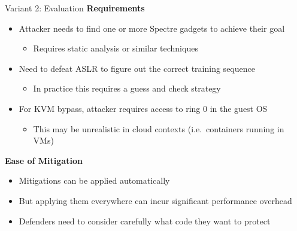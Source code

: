 \documentclass[10pt, dvipsnames, aspectratio=169]{beamer}
\begin{document}
\begin{frame}[c, fragile]{Variant 2: Evaluation}{}
  {\bf Requirements}
  \begin{itemize}
    \item Attacker needs to find one or more Spectre gadgets to achieve their goal
    \begin{itemize}
      \item Requires static analysis or similar techniques
    \end{itemize}
    \item Need to defeat ASLR to figure out the correct training sequence
    \begin{itemize}
      \item In practice this requires a guess and check strategy
    \end{itemize}
    \item For KVM bypass, attacker requires access to ring 0 in the guest OS
    \begin{itemize}
      \item This may be unrealistic in cloud contexts (i.e.~containers running in VMs)
    \end{itemize}
  \end{itemize}

  \vfill
  {\bf Ease of Mitigation}
  \begin{itemize}
    \item Mitigations can be applied automatically
    \item But applying them everywhere can incur significant performance overhead
    \item Defenders need to consider carefully what code they want to protect
  \end{itemize}
\end{frame}
\end{document}
